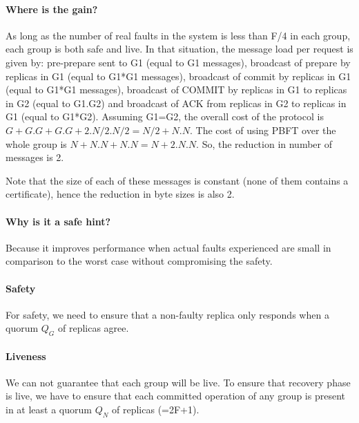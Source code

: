 \documentclass[twocolumn,10pt]{article}
\begin{document}
\paragraph{Where is the gain?} As long as the number of real faults in the system is less than F/4 in each group,
each group is both safe and live. In that situation, the message load per request is given by: pre-prepare sent to 
G1 (equal to G1 messages), broadcast of prepare by replicas in G1 (equal to G1*G1 messages), broadcast of commit by
replicas in G1 (equal to G1*G1 messages), broadcast of COMMIT
by replicas in G1 to replicas in G2 (equal to G1.G2) and broadcast of ACK from  replicas in G2 to replicas in G1
(equal to G1*G2). Assuming G1=G2, the overall cost of the protocol is $G+G.G+G.G + 2.N/2.N/2=N/2+N.N$. The cost of using PBFT over the whole group is $N+N.N + N.N=N+2.N.N$. So, the reduction in number of messages is 2.

Note that the size of each of these messages is constant (none of them contains a certificate), hence the reduction
in byte sizes is also 2.

\paragraph{Why is it a safe hint?} Because it improves performance when actual faults experienced are small in
comparison to the worst case without compromising the safety.

\paragraph{Safety} For safety, we need to ensure that a non-faulty replica only responds when a quorum $Q_G$ of replicas agree. 

\paragraph{Liveness} We can not guarantee that each group will be live. To ensure that recovery phase is live, we have to ensure that each committed operation of any group
is present in at least a quorum $Q_N$ of replicas (=2F+1). 
\end{document}
